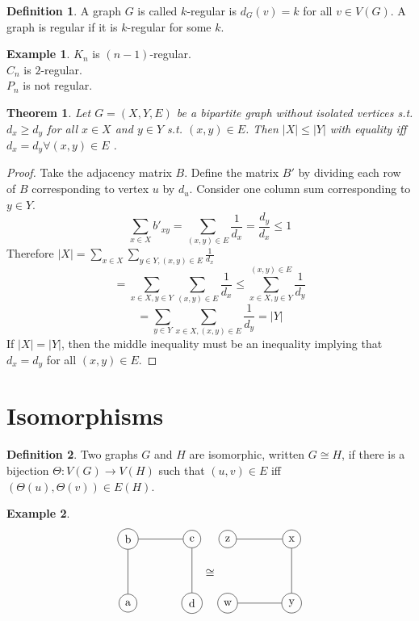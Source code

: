 \documentclass{article}
\newtheorem*{thm}{Theorem}
\theoremstyle{definition}
\newtheorem*{defn}{Definition}
\newtheorem*{ex}{Example}
\begin{document}
\begin{defn}
A graph $G$ is called $k$-regular is $d_G(v) = k$ for all $v\in V(G)$.
A graph is regular if it is $k$-regular for some $k$.
\end{defn}

\begin{ex}
$K_n$ is $(n-1)$-regular. \\
$C_n$ is $2$-regular. \\
$P_n$ is not regular. \\
\end{ex}


\begin{thm}
Let $G=(X,Y,E)$ be a bipartite graph without isolated vertices s.t. $d_x\geq d_y$ for all $x\in X$ and $y\in Y$ s.t. $(x,y)\in E$.
Then $|X| \leq |Y|$ with equality iff $d_x = d_y \forall (x,y)\in E$ .
\end{thm}
\begin{proof}
Take the adjacency matrix $B$.
Define the matrix $B'$ by dividing each row of $B$ corresponding to vertex $u$ by $d_u$.
Consider one column sum corresponding to $y\in Y$.
$$\sum_{x\in X} b'_{xy} = \sum_{(x,y)\in E} \frac{1}{d_x} = \frac{d_y}{d_x} \leq 1$$
Therefore $|X|=\sum_{x\in X}\sum_{y\in Y,(x,y)\in E} \frac{1}{d_x}$
$$=\sum_{x\in X, y\in Y}\sum_{(x,y)\in E} \frac{1}{d_x} \leq \sum_{x\in X, y\in Y}^{(x,y)\in E} \frac{1}{d_y}$$
$$=\sum_{y\in Y} \sum_{x\in X,(x,y)\in E} \frac{1}{d_y} = |Y|$$
If $|X|=|Y|$, then the middle inequality must be an inequality implying that $d_x=d_y$ for all $(x,y)\in E$.
\end{proof}

\section{Isomorphisms}

\begin{defn}
Two graphs $G$ and $H$ are isomorphic, written $G\cong H$, if there is a bijection $\Theta\colon V(G) \to V(H)$ such that $(u,v)\in E$ iff $(\Theta(u),\Theta(v))\in E(H)$.
\end{defn}

\begin{ex}
$$
\begin{tikzpicture}[baseline=5.5ex]
  \node[draw,circle] (G-1) at (0,0) {a};
  \node[draw,circle] (G-2) at (0,2) {b};
  \node[draw,circle] (G-3) at (2,2) {c};
  \node[draw,circle] (G-4) at (2,0) {d};
  \draw (G-1) -- (G-2) -- (G-3) -- (G-4);
\end{tikzpicture}\cong
\begin{tikzpicture}[baseline=5.5ex]
  \node[draw,circle] (G-1) at (0,0) {w};
  \node[draw,circle] (G-2) at (0,2) {z};
  \node[draw,circle] (G-3) at (2,2) {x};
  \node[draw,circle] (G-4) at (2,0) {y};
  \draw (G-1) -- (G-4) -- (G-3) -- (G-2);
\end{tikzpicture}$$
\end{ex}
\end{document}
